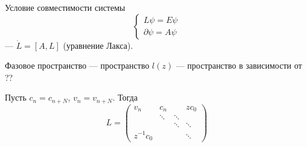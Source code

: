 \documentclass[12pt,a4paper]{article}
\begin{document}
    Условие совместимости системы
    \[
        \begin{cases}
            L \psi = E \psi\\
            \partial \psi = A \psi
        \end{cases}
    \]
    --- $\dot{L} = [A, L]$ (уравнение Лакса).

    Фазовое пространство --- пространство $l(z)$ --- пространство в зависимости от ??

    Пусть $c_n = c_{n + N}$, $v_n = v_{n + N}$. Тогда
    \[
        L = 
        \begin{pmatrix}
            v_n& c_n&& z c_0\\
            & \ddots& \ddots\\
            && \ddots& \ddots\\
            z^{-1} c_0 &&& \ddots
        \end{pmatrix}
    \]
\end{document}

